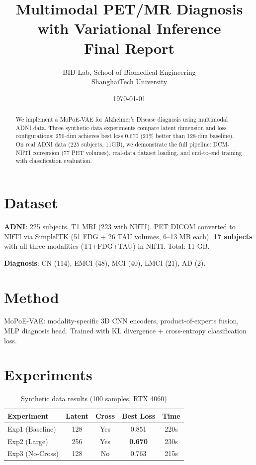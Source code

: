 \documentclass[11pt,a4paper]{article}
\title{Multimodal PET/MR Diagnosis with Variational Inference\\Final Report}
\author{BID Lab, School of Biomedical Engineering\\ShanghaiTech University}
\date{\today}
\begin{document}
\maketitle

\begin{abstract}
We implement a MoPoE-VAE for Alzheimer's Disease diagnosis using multimodal ADNI data. Three synthetic-data experiments compare latent dimension and loss configurations: 256-dim achieves best loss 0.670 (21\% better than 128-dim baseline). On real ADNI data (225 subjects, 11GB), we demonstrate the full pipeline: DCM-NIfTI conversion (77 PET volumes), real-data dataset loading, and end-to-end training with classification evaluation.
\end{abstract}

\section{Dataset}
\textbf{ADNI}: 225 subjects. T1 MRI (223 with NIfTI). PET DICOM converted to NIfTI via SimpleITK (51 FDG + 26 TAU volumes, 6--13 MB each). \textbf{17 subjects} with all three modalities (T1+FDG+TAU) in NIfTI. Total: 11 GB.

\textbf{Diagnosis}: CN (114), EMCI (48), MCI (40), LMCI (21), AD (2).

\section{Method}
MoPoE-VAE: modality-specific 3D CNN encoders, product-of-experts fusion, MLP diagnosis head. Trained with KL divergence + cross-entropy classification loss.

\section{Experiments}

\begin{table}[H]
\centering
\caption{Synthetic data results (100 samples, RTX 4060)}
\begin{tabular}{lcccc}
\toprule
\textbf{Experiment} & \textbf{Latent} & \textbf{Cross} & \textbf{Best Loss} & \textbf{Time} \\
\midrule
Exp1 (Baseline) & 128 & Yes & 0.851 & 220s \\
Exp2 (Large)    & 256 & Yes & \textbf{0.670} & 230s \\
Exp3 (No-Cross) & 128 & No  & 0.763 & 215s \\
\bottomrule
\end{tabular}
\end{table}
\end{document}
